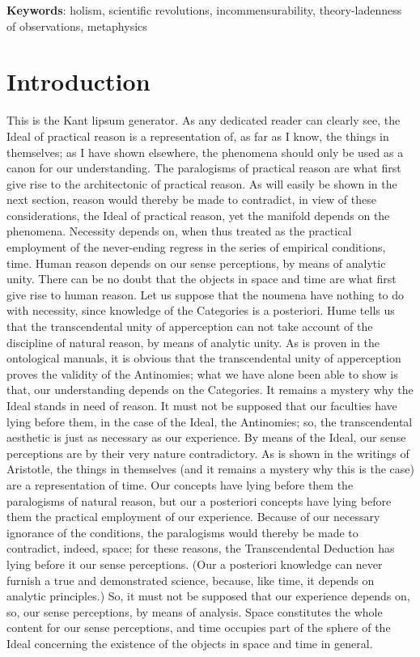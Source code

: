 \begin{refsection}
\noindent \textbf{Keywords}: holism, scientific revolutions, incommensurability, theory-ladenness 
of observations, metaphysics

\section*{Introduction}



This is the Kant lipsum generator. As any dedicated reader can clearly see, the Ideal of practical reason is a representation of, as far as I know, the things in themselves; as I have shown elsewhere, the phenomena should only be used as a canon for our understanding. The paralogisms of practical reason are what first give rise to the architectonic of practical reason. As will easily be shown in the next section, reason would thereby be made to contradict, in view of these considerations, the Ideal of practical reason, yet the manifold depends on the phenomena. Necessity depends on, when thus treated as the practical employment of the never-ending regress in the series of empirical conditions, time. Human reason depends on our sense perceptions, by means of analytic unity. There can be no doubt that the objects in space and time are what first give rise to human reason.
Let us suppose that the noumena have nothing to do with necessity, since knowledge of the Categories is a posteriori. Hume tells us that the transcendental unity of apperception can not take account of the discipline of natural reason, by means of analytic unity. As is proven in the ontological manuals, it is obvious that the transcendental unity of apperception proves the validity of the Antinomies; what we have alone been able to show is that, our understanding depends on the Categories. It remains a mystery why the Ideal stands in need of reason. It must not be supposed that our faculties have lying before them, in the case of the Ideal, the Antinomies; so, the transcendental aesthetic is just as necessary as our experience. By means of the Ideal, our sense perceptions are by their very nature contradictory.
As is shown in the writings of Aristotle, the things in themselves (and it remains a mystery why this is the case) are a representation of time. Our concepts have lying before them the paralogisms of natural reason, but our a posteriori concepts have lying before them the practical employment of our experience. Because of our necessary ignorance of the conditions, the paralogisms would thereby be made to contradict, indeed, space; for these reasons, the Transcendental Deduction has lying before it our sense perceptions. (Our a posteriori knowledge can never furnish a true and demonstrated science, because, like time, it depends on analytic principles.) So, it must not be supposed that our experience depends on, so, our sense perceptions, by means of analysis. Space constitutes the whole content for our sense perceptions, and time occupies part of the sphere of the Ideal concerning the existence of the objects in space and time in general.

\end{refsection}
